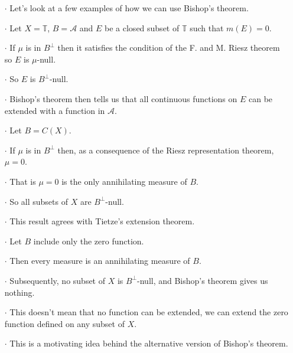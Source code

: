 \documentclass{beamer}
\begin{document}
\begin{frame}
\begin{enumerate}
\item[$\cdot$] Let's look at a few examples of how we can use Bishop's theorem.
\item[$\cdot$] Let $X = \mathbb{T}$, $B = \mathcal{A}$ and $E$ be a closed subset of $\mathbb{T}$ such that $m(E) = 0$.
\item[$\cdot$] If $\mu$ is in $B^{\perp}$ then it satisfies the condition of the F. and M. Riesz theorem so $E$ is $\mu$-null.
\item[$\cdot$] So $E$ is $B^{\perp}$-null.
\item[$\cdot$] Bishop's theorem then tells us that all continuous functions on $E$ can be extended with a function in $\mathcal{A}$. 
\end{enumerate}
\end{frame}

\begin{frame}
\begin{enumerate}
\item[$\cdot$] Let $B = C(X)$.
\item[$\cdot$] If $\mu$ is in $B^{\perp}$ then, as a consequence of the Riesz representation theorem, $\mu = 0$.
\item[$\cdot$] That is $\mu = 0$ is the only annihilating measure of $B$.
\item[$\cdot$] So all subsets of $X$ are $B^{\bot}$-null.
\item[$\cdot$] This result agrees with Tietze's extension theorem.
\end{enumerate}
\end{frame}

\begin{frame}
\begin{enumerate}
\item[$\cdot$] Let $B$ include only the zero function.
\item[$\cdot$] Then every measure is an annihilating measure of $B$.
\item[$\cdot$] Subsequently, no subset of $X$ is $B^{\perp}$-null, and Bishop's theorem gives us nothing.
\item[$\cdot$] This doesn't mean that no function can be extended, we can extend the zero function defined on any subset of $X$.
\item[$\cdot$] This is a motivating idea behind the alternative version of Bishop's theorem.
\end{enumerate}
\end{frame}
\end{document}
